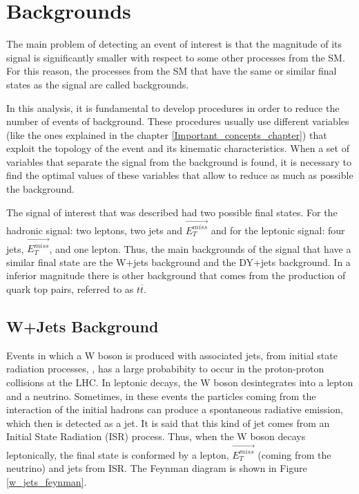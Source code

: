  \section{Backgrounds}
 
The main problem of detecting an event of interest is that the magnitude of its signal is significantly smaller with respect to some other processes from the SM. For this reason, the processes from the
SM that have the same or similar final states as the signal are called backgrounds. 

In this analysis, it is fundamental to develop procedures in order to reduce the number of events of background. These procedures usually use different variables (like the ones explained in the chapter \ref{Important_concepts_chapter}) that exploit the topology of the event and its 
kinematic characteristics. When a set of variables that separate the signal from the background is found, it is necessary to find the optimal values of these variables that allow to reduce as much as possible the background. 
 
The signal of interest that was described had two possible final states. For the hadronic signal: two leptons, two jets and $\vec{E_T^{miss}}$ and for the leptonic signal: four jets, 
$\vec{E_T^{miss}}$, and one lepton. Thus, the main backgrounds of the signal that have a similar final state are the W+jets background and the DY+jets background. In a inferior magnitude there
is other background that comes from the production of quark top pairs, referred to as $t\overline{t}$.

 
\subsection{W+Jets Background}
  
Events in which a W boson is produced with associated jets, from initial state radiation processes, , has a large probabibity to occur in the proton-proton collisions at the LHC. In leptonic decays, the W boson desintegrates into a lepton and a neutrino. Sometimes, in these events the particles coming from the interaction of the initial hadrons can produce a spontaneous radiative emission, which then is detected as a jet. It is said that this kind of jet comes from an Initial State Radiation (ISR) process. Thus, when the W boson decays leptonically, the final state is conformed by a lepton, $\vec{E_T^{miss}}$ (coming from the neutrino) and jets from ISR. The Feynman diagram is shown 
in Figure \ref{w_jets_feynman}.

